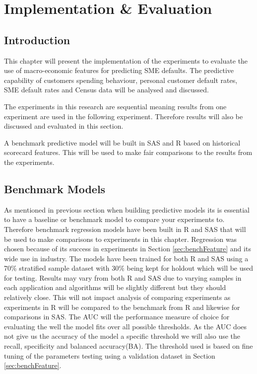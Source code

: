 
\chapter{Implementation \& Evaluation} %

\label{Chapter5} %


\section{Introduction}
This chapter will present the implementation of the experiments to evaluate the use of macro-economic features for predicting SME defaults. The predictive capability of customers spending behaviour, personal customer default rates, SME default rates and Census data  will be analysed and discussed.

The experiments in this research are sequential meaning results from one experiment are used in the following experiment. Therefore results will also be discussed and evaluated in this section.

A benchmark predictive model will be built in SAS and R based on historical scorecard features. This will be used to make fair comparisons to the results from the experiments.


\section{Benchmark Models}
As mentioned in previous section when building predictive models its is essential to have a baseline or benchmark model to compare your experiments to. Therefore benchmark regression models have been built in R and SAS that will be used to make comparisons to experiments in this chapter. Regression was chosen because of its success in experiments in Section \ref{sec:benchFeature} and its wide use in industry. The models have been trained for both R and SAS using a 70\% stratified sample dataset with 30\% being kept for holdout which will be used for testing. Results may vary from both R and SAS due to varying samples in each application and algorithms will be slightly different but they should relatively close. This will not impact analysis of comparing experiments as experiments in R will be compared to the benchmark from R and likewise for comparisons in SAS. The AUC will the performance measure of choice for evaluating the well the model fits over all possible thresholds. As the AUC does not give us the accuracy of the model a specific threshold we will also use the recall, specificity and balanced accuracy(BA). The threshold used is based on fine tuning of the parameters testing using a validation dataset in Section \ref{sec:benchFeature}.

